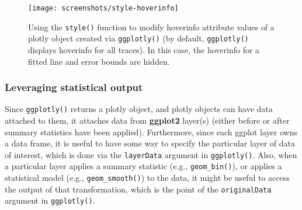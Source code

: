 \documentclass[12pt,]{isuthesis}
\newenvironment{Shaded}{\begin{snugshade}}{\end{snugshade}}
\newcommand{\KeywordTok}[1]{\textcolor[rgb]{0.13,0.29,0.53}{\textbf{{#1}}}}
\newcommand{\DataTypeTok}[1]{\textcolor[rgb]{0.13,0.29,0.53}{{#1}}}
\newcommand{\DecValTok}[1]{\textcolor[rgb]{0.00,0.00,0.81}{{#1}}}
\newcommand{\StringTok}[1]{\textcolor[rgb]{0.31,0.60,0.02}{{#1}}}
\newcommand{\CommentTok}[1]{\textcolor[rgb]{0.56,0.35,0.01}{\textit{{#1}}}}
\newcommand{\OtherTok}[1]{\textcolor[rgb]{0.56,0.35,0.01}{{#1}}}
\newcommand{\NormalTok}[1]{{#1}}
\begin{document}
\begin{figure}
\centering
\texttt{[image: screenshots/style-hoverinfo]}
\caption{\label{fig:style-hoverinfo}Using the \texttt{style()} function to
modify hoverinfo attribute values of a plotly object created via
\texttt{ggplotly()} (by default, \texttt{ggplotly()} displays hoverinfo
for all traces). In this case, the hoverinfo for a fitted line and error
bounds are hidden.}
\end{figure}

\subsubsection{Leveraging statistical
output}\label{leveraging-statistical-output}

Since \texttt{ggplotly()} returns a plotly object, and plotly objects
can have data attached to them, it attaches data from \textbf{ggplot2}
layer(s) (either before or after summary statistics have been applied).
Furthermore, since each ggplot layer owns a data frame, it is useful to
have some way to specify the particular layer of data of interest, which
is done via the \texttt{layerData} argument in \texttt{ggplotly()}.
Also, when a particular layer applies a summary statistic (e.g.,
\texttt{geom\_bin()}), or applies a statistical model (e.g.,
\texttt{geom\_smooth()}) to the data, it might be useful to access the
output of that transformation, which is the point of the
\texttt{originalData} argument in \texttt{ggplotly()}.

\begin{Shaded}
\end{Shaded}
\end{document}
